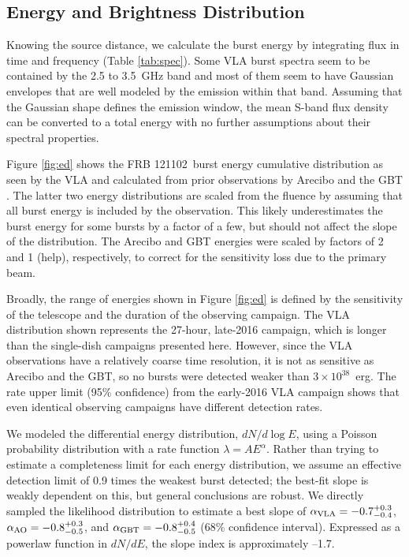 \documentclass[twocolumn]{aastex61}
\newcommand{\frb}{FRB 121102}
\begin{document}
\subsection{Energy and Brightness Distribution}
\label{sec:disn}
Knowing the source distance, we calculate the burst energy by integrating flux in time and frequency (Table \ref{tab:spec}). Some VLA burst spectra seem to be contained by the 2.5 to 3.5~GHz band and most of them seem to have Gaussian envelopes that are well modeled by the emission within that band. Assuming that the Gaussian shape defines the emission window, the mean S-band flux density can be converted to a total energy with no further assumptions about their spectral properties.

Figure \ref{fig:ed} shows the \frb\ burst energy cumulative distribution as seen by the VLA and calculated from prior observations by Arecibo and the GBT \citep{2016Natur.531..202S,2016arXiv160308880S}. The latter two energy distributions are scaled from the fluence by assuming that all burst energy is included by the observation. This likely underestimates the burst energy for some bursts by a factor of a few, but should not affect the slope of the distribution. The Arecibo and GBT energies were scaled by factors of {\color{red} 2 and 1 (help)}, respectively, to correct for the sensitivity loss due to the primary beam.

Broadly, the range of energies shown in Figure \ref{fig:ed} is defined by the sensitivity of the telescope and the duration of the observing campaign. The VLA distribution shown represents the 27-hour, late-2016 campaign, which is longer than the single-dish campaigns presented here. However, since the VLA observations have a relatively coarse time resolution, it is not as sensitive as Arecibo and the GBT, so no bursts were detected weaker than $3\times10^{38}$~erg. The rate upper limit (95\% confidence) from the early-2016 VLA campaign shows that even identical observing campaigns have different detection rates.

We modeled the differential energy distribution, $dN/d\log{E}$, using a Poisson probability distribution with a rate function $\lambda = A E^{\alpha}$. Rather than trying to estimate a completeness limit for each energy distribution, we assume an effective detection limit of 0.9 times the weakest burst detected; the best-fit slope is weakly dependent on this, but general conclusions are robust. We directly sampled the likelihood distribution to estimate a best slope of $\alpha_{\rm{VLA}}=-0.7^{+0.3}_{-0.4}$, $\alpha_{\rm{AO}}=-0.8^{+0.3}_{-0.5}$, and $\alpha_{\rm{GBT}}=-0.8^{+0.4}_{-0.5}$ (68\% confidence interval). Expressed as a powerlaw function in $dN/dE$, the slope index is approximately --1.7. 
\end{document}
